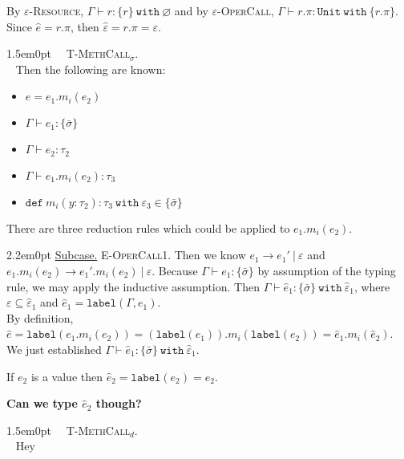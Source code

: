 \documentclass{llncs}
\newcommand{\keywadj}[1]{\mathtt{#1}}
\newcommand{\keyw}[1]{\keywadj{#1}~}
\newcommand{\proofcase}[2]{
	\begin{adjustwidth}{1.5em}{0pt}
		\fbox{Case.}~~#1. \\ ~#2
	\end{adjustwidth}
}
\newcommand{\subcase}[1] {
	\begin{adjustwidth}{2.2em}{0pt}
		\underline{Subcase.} #1
	\end{adjustwidth}
}
\newcommand{\type}[2]{
	#1~\keyw{with} #2
}
\begin{document}
{{{\noindent
By \textsc{$\varepsilon$-Resource}, $\Gamma \vdash r : \type{ \{ r \} }{\varnothing}$ and by \textsc{$\varepsilon$-OperCall}, $\Gamma \vdash r.\pi : \type{\keywadj{Unit}}{\{ r.\pi \}}$. Since $\hat e = r.\pi$, then $\hat \varepsilon = r.\pi = \varepsilon$.\\
	}
}

\proofcase{\textsc{T-MethCall$_\sigma$}}{
Then the following are known:
\begin{itemize}
	\item $e = e_1.m_i(e_2)$
	\item $\Gamma \vdash e_1 : \{ \bar \sigma \}$
	\item $\Gamma \vdash e_2 : \tau_2$
	\item $\Gamma \vdash e_1.m_i(e_2) : \tau_3$
	\item $\keywadj{def}~m_i(y:\tau_2) : \type{\tau_3}{\varepsilon_3} \in \{ \bar \sigma \}$
\end{itemize}
There are three reduction rules which could be applied to $e_1.m_i(e_2)$.

	\subcase{\textsc{E-OperCall1}.
	Then we know $e_1 \longrightarrow e_1'~|~\varepsilon$ and $e_1.m_i(e_2) \longrightarrow e_1'.m_i(e_2)~|~\varepsilon$. Because $\Gamma \vdash e_1 : \{ \bar \sigma \}$ by assumption of the typing rule, we may apply the inductive assumption. Then $\Gamma \vdash \hat e_1 : \type{ \{ \bar \sigma \} }{\hat \varepsilon_1}$, where $\varepsilon \subseteq \hat \varepsilon_1$ and $\hat e_1 = \keywadj{label}(\Gamma, e_1)$.\\
	
\noindent
By definition, $\hat e = \keywadj{label}(e_1.m_i(e_2)) = (\keywadj{label}(e_1)).m_i(\keywadj{label}(e_2)) = \hat e_1.m_i(\hat e_2)$. We just established $\Gamma \vdash \hat e_1 : \type{ \{ \bar \sigma \} }{\hat \varepsilon_1}$.

\noindent
If $e_2$ is a value then $\hat e_2 = \keywadj{label}(e_2) = e_2$. 

 \textbf{Can we type $\hat e_2$ though?}
	
	}
}

\proofcase{\textsc{T-MethCall$_d$}}{
Hey
}
}
\end{document}
